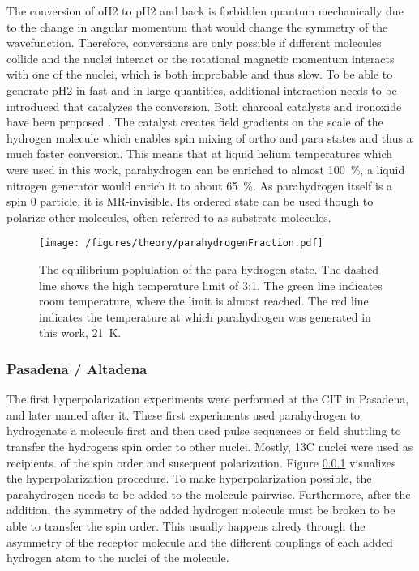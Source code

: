             The conversion of oH2 to pH2 and back is forbidden quantum mechanically due to the change in angular momentum that would change the symmetry of the wavefunction. Therefore, conversions are only possible if different molecules collide and the nuclei interact or the rotational magnetic momentum interacts with one of the nuclei, which is both improbable and thus slow. To be able to generate pH2 in fast and in large quantities, additional interaction needs to be introduced that catalyzes the conversion. Both charcoal catalysts and ironoxide have been proposed \cite{}. The catalyst creates field gradients on the scale of the hydrogen molecule which enables spin mixing of ortho and para states\cite{spinCatalysisOfOrthoParaHydrogenConversion} and thus a much faster conversion. This means that at liquid helium temperatures which were used in this work, parahydrogen can be enriched to almost \SI{100}{\%}, a liquid nitrogen generator would enrich it to about \SI{65}{\%}.
            As parahydrogen itself is a spin 0 particle, it is MR-invisible. Its ordered state can be used though to polarize other molecules, often referred to as substrate molecules.
            \begin{figure}
                \centering
                \texttt{[image: /figures/theory/parahydrogenFraction.pdf]}
                \caption[Parahydrogen fraction]{The equilibrium poplulation of the para hydrogen state. The dashed line shows the high temperature limit of 3:1. The green line indicates room temperature, where the limit is almost reached. The red line indicates the temperature at which parahydrogen was generated in this work, \SI{21}{\kelvin}.}
                \label{figure:theory:ph2Fraction}
            \end{figure}
        \subsubsection{Pasadena / Altadena}
        The first hyperpolarization experiments were performed at the CIT in Pasadena, and later named after it. These first experiments used parahydrogen to hydrogenate a molecule first and then used pulse sequences or field shuttling to transfer the hydrogens spin order to other nuclei. Mostly, 13C nuclei were used as recipients. of the spin order and susequent polarization. Figure \ref{} visualizes the hyperpolarization procedure. To make hyperpolarization possible, the parahydrogen needs to be added to the molecule pairwise. Furthermore, after the addition, the symmetry of the added hydrogen molecule must be broken to be able to transfer the spin order. This usually happens alredy through the asymmetry of the receptor molecule and the different couplings of each added hydrogen atom to the nuclei of the molecule.
